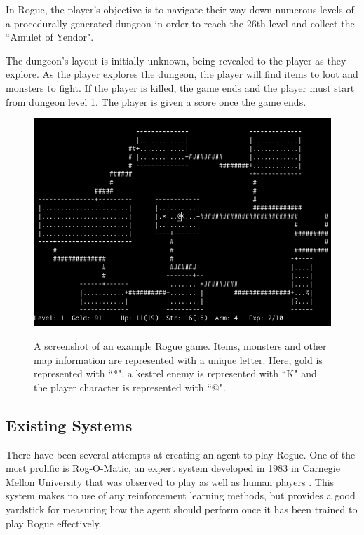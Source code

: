 \documentclass[11pt,a4paper]{article}
\begin{document}
In Rogue, the player's objective is to navigate their way down numerous levels of a procedurally generated dungeon in order to reach the 26th level and collect the ``Amulet of Yendor".

The dungeon's layout is initially unknown, being revealed to the player as they explore. As the player explores the dungeon, the player will find items to loot and monsters to fight. If the player is killed, the game ends and the player must start from dungeon level 1. The player is given a score once the game ends.

\begin{figure}[t]
	\caption{A screenshot of an example Rogue game. Items, monsters and other map information are represented with a unique letter. Here, gold is represented with ``*", a kestrel enemy is represented with ``K" and the player character is represented with ``@".}
	\centering
	\includegraphics[scale=0.5]{rogue_screenshot}
	\label{rogsc}
\end{figure}

\subsection{Existing Systems}
There have been several attempts at creating an agent to play Rogue. One of the most prolific is Rog-O-Matic, an expert system developed in 1983 in Carnegie Mellon University that was observed to play as well as human players \cite[p.8]{mauldin83}. This system makes no use of any reinforcement learning methods, but provides a good yardstick for measuring how the agent should perform once it has been trained to play Rogue effectively.
\end{document}

